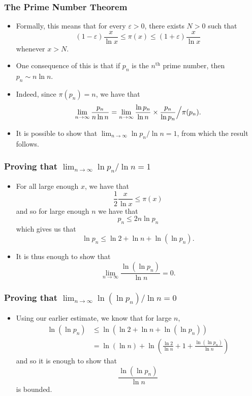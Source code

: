 \documentclass{beamer}
\begin{document}
\begin{frame}
    \frametitle{The Prime Number Theorem}

    \begin{itemize}
        \item Formally, this means that for every $\varepsilon > 0$, there exists $N > 0$ such that
        \[
            (1 - \varepsilon) \frac{x}{\ln x} \leq \pi(x) \leq (1 + \varepsilon) \frac{x}{\ln x}    
        \]
        whenever $x > N$. \pause
        \item One consequence of this is that if $p_n$ is the $n^\text{th}$ prime number, then $p_n \sim n \ln n$. \pause
        \item Indeed, since $\pi(p_n) = n$, we have that
        \[
            \lim_{n \to \infty} \frac{p_n}{n \ln n} = \lim_{n \to \infty} \frac{\ln p_n}{\ln n} \times \frac{p_n}{\ln p_n} \Big\slash \pi(p_n).
        \]
        \pause
        \item It is possible to show that $\lim_{n \to \infty} \ln p_n \slash \ln n = 1$, from which the result follows.
    \end{itemize} 

\end{frame}

\begin{frame}
    \frametitle{Proving that $\lim_{n \to \infty} \ln p_n \slash \ln n = 1$}

    \begin{itemize}
        \item For all large enough $x$, we have that
        \[
            \frac{1}{2} \frac{x}{\ln x} \leq \pi(x)    
        \]
        and so for large enough $n$ we have that
        \[
            p_n \leq 2 n \ln p_n 
        \]
        which gives us that
        \[
            \ln p_n \leq \ln 2 + \ln n + \ln(\ln p_n).
        \]
        \pause
        \item It is thus enough to show that
        \[
            \lim_{n \to \infty} \frac{\ln(\ln p_n)}{\ln n} = 0.    
        \] 
    \end{itemize} 

\end{frame}

\begin{frame}
    \frametitle{Proving that $\lim_{n \to \infty} \ln(\ln p_n) \slash \ln n = 0$}

    \begin{itemize}
        \item Using our earlier estimate, we know that for large $n$,
        \begin{align*}
            \ln(\ln p_n) & \leq \ln\left(\ln 2 + \ln n + \ln(\ln p_n) \right) \\
            & = \ln(\ln n) + \ln\left(\frac{\ln 2}{\ln n} + 1 + \frac{\ln(\ln p_n)}{\ln n}\right)
        \end{align*}
        and so it is enough to show that
        \[
            \frac{\ln(\ln p_n)}{\ln n}
        \]
        is bounded.
    \end{itemize} 

\end{frame}
\end{document}
